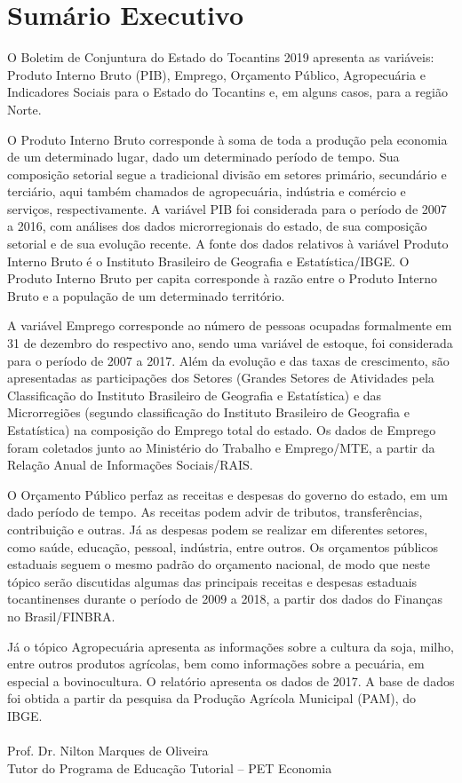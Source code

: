 \chapter*{Sumário Executivo}
\begin{center}
	\parbox{0.7\linewidth}{
		\par O Boletim de Conjuntura do Estado do Tocantins 2019 apresenta as variáveis: Produto Interno Bruto (PIB), Emprego, Orçamento Público, Agropecuária e Indicadores Sociais para o Estado do Tocantins e, em alguns casos, para a região Norte. 
		\par O Produto Interno Bruto corresponde à soma de toda a produção pela economia de um determinado lugar, dado um determinado período de tempo. Sua composição setorial segue a tradicional divisão em setores primário, secundário e terciário, aqui também chamados de agropecuária, indústria e comércio e serviços, respectivamente. A variável PIB foi considerada para o período de 2007 a 2016, com análises dos dados microrregionais do estado, de sua composição setorial e de sua evolução recente. A fonte dos dados relativos à variável Produto Interno Bruto é o Instituto Brasileiro de Geografia e Estatística/IBGE. O Produto Interno Bruto per capita corresponde à razão entre o Produto Interno Bruto e a população de um determinado território.  
		\par A variável Emprego corresponde ao número de pessoas ocupadas formalmente em 31 de dezembro do respectivo ano, sendo uma variável de estoque, foi considerada para o período de 2007 a 2017. Além da evolução e das taxas de crescimento, são apresentadas as participações dos Setores (Grandes Setores de Atividades pela Classificação do Instituto Brasileiro de Geografia e Estatística) e das Microrregiões (segundo classificação do Instituto Brasileiro de Geografia e Estatística) na composição do Emprego total do estado. Os dados de Emprego foram coletados junto ao Ministério do Trabalho e Emprego/MTE, a partir da Relação Anual de Informações Sociais/RAIS. 
		\par O Orçamento Público perfaz as receitas e despesas do governo do estado, em um dado período de tempo. As receitas podem advir de tributos, transferências, contribuição e outras. Já as despesas podem se realizar em diferentes setores, como saúde, educação, pessoal, indústria, entre outros. Os orçamentos públicos estaduais seguem o mesmo padrão do orçamento nacional, de modo que neste tópico serão discutidas algumas das principais receitas e despesas estaduais tocantinenses durante o período de 2009 a 2018, a partir dos dados do Finanças no Brasil/FINBRA. 
		\par Já o tópico Agropecuária apresenta as informações sobre a cultura da soja, milho, entre outros produtos agrícolas, bem como informações sobre a pecuária, em especial a bovinocultura. O relatório apresenta os dados de 2017. A base de dados foi obtida a partir da pesquisa da Produção Agrícola Municipal (PAM), do IBGE.
		\\
		\\
		Prof. Dr. Nilton Marques de Oliveira\\
		Tutor do Programa de Educação Tutorial – PET Economia
	}
\end{center}
\thispagestyle{empty}
